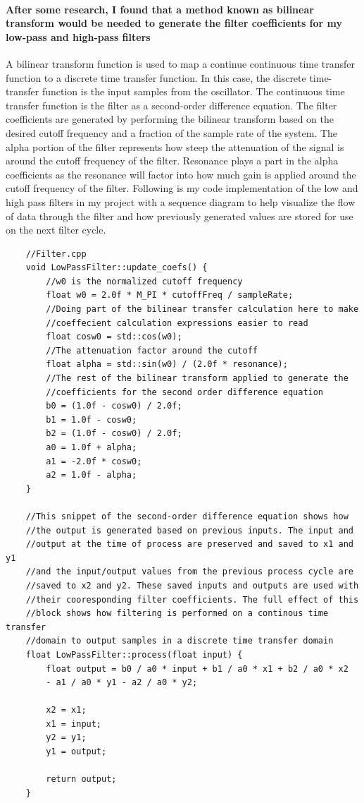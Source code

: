 \documentclass[acmlarge,screen]{acmart}
\begin{document}
	\paragraph{After some research, I found that a method known as bilinear transform would be needed to generate the filter coefficients for my low-pass and high-pass filters} A bilinear transform function is used to map a continue continuous time transfer function to a discrete time transfer function. In this case, the discrete time-transfer function is the input samples from the oscillator. The continuous time transfer function is the filter as a second-order difference equation. The filter coefficients are generated by performing the bilinear transform based on the desired cutoff frequency and a fraction of the sample rate of the system. The alpha portion of the filter represents how steep the attenuation of the signal is around the cutoff frequency of the filter. Resonance plays a part in the alpha coefficients as the resonance will factor into how much gain is applied around the cutoff frequency of the filter. Following is my code implementation of the low and high pass filters in my project with a sequence diagram to help visualize the flow of data through the filter and how previously generated values are stored for use on the next filter cycle.

	\clearpage

	\begin{verbatim}
	//Filter.cpp
	void LowPassFilter::update_coefs() {
		//w0 is the normalized cutoff frequency
		float w0 = 2.0f * M_PI * cutoffFreq / sampleRate;
		//Doing part of the bilinear transfer calculation here to make
		//coeffecient calculation expressions easier to read
		float cosw0 = std::cos(w0); 
		//The attenuation factor around the cutoff
		float alpha = std::sin(w0) / (2.0f * resonance); 
		//The rest of the bilinear transform applied to generate the 
		//coefficients for the second order difference equation
		b0 = (1.0f - cosw0) / 2.0f;
		b1 = 1.0f - cosw0;
		b2 = (1.0f - cosw0) / 2.0f;
		a0 = 1.0f + alpha;
		a1 = -2.0f * cosw0;
		a2 = 1.0f - alpha;
	}
	
	//This snippet of the second-order difference equation shows how
	//the output is generated based on previous inputs. The input and
	//output at the time of process are preserved and saved to x1 and y1
	//and the input/output values from the previous process cycle are
	//saved to x2 and y2. These saved inputs and outputs are used with
	//their cooresponding filter coefficients. The full effect of this
	//block shows how filtering is performed on a continous time transfer
	//domain to output samples in a discrete time transfer domain
	float LowPassFilter::process(float input) {
		float output = b0 / a0 * input + b1 / a0 * x1 + b2 / a0 * x2
		- a1 / a0 * y1 - a2 / a0 * y2;
		
		x2 = x1;
		x1 = input;
		y2 = y1;
		y1 = output;
		
		return output;
	}
	\end{verbatim}
\end{document}
